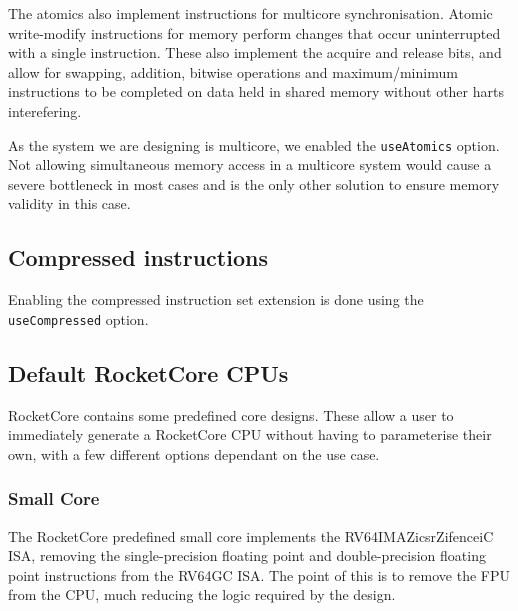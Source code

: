 The atomics also implement instructions for multicore synchronisation. Atomic write-modify instructions for memory perform changes that occur uninterrupted with a single instruction. These also implement the acquire and release bits, and allow for swapping, addition, bitwise operations and maximum/minimum instructions to be completed on data held in shared memory without other harts interefering.

As the system we are designing is multicore, we enabled the \texttt{useAtomics} option. Not allowing simultaneous memory access in a multicore system would cause a severe bottleneck in most cases and is the only other solution to ensure memory validity in this case.

\subsection{Compressed instructions}
Enabling the compressed instruction set extension is done using the \texttt{useCompressed} option.

\subsection{Default RocketCore CPUs}
RocketCore contains some predefined core designs. These allow a user to immediately generate a RocketCore CPU without having to parameterise their own, with a few different options dependant on the use case.

\subsubsection{Small Core}
The RocketCore predefined small core implements the RV64IMAZicsrZifenceiC ISA, removing the single-precision floating point and double-precision floating point instructions from the RV64GC ISA. The point of this is to remove the FPU from the CPU, much reducing the logic required by the design.

